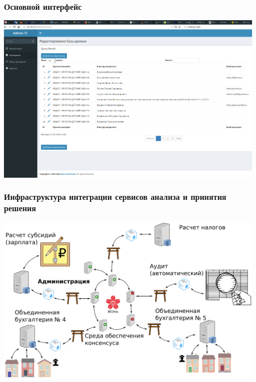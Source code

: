 \documentclass[10pt]{beamer}
\begin{document}
\begin{frame}
  \frametitle{Основной интерфейс}
  \hspace{-5em}
  \includegraphics[width=1.3\linewidth]{pics/quest-table-shot.png}
\end{frame}

\begin{frame}
  \frametitle{Инфраструктура интеграции сервисов анализа и принятия решения}
  \centering
  \includegraphics[width=1\linewidth]{pics/system-with-consensus.pdf}
\end{frame}
\end{document}
